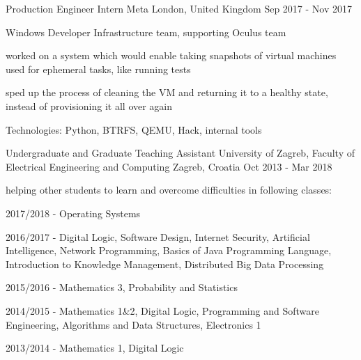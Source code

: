 \begin{cventries}
  \cventry
    {Production Engineer Intern} %
    {Meta} %
    {London, United Kingdom} %
    {Sep 2017 - Nov 2017} %
    {
      \begin{cvitems} %
        \item {Windows Developer Infrastructure team, supporting Oculus team}
        \item {worked on a system which would enable taking snapshots of virtual machines used for ephemeral tasks, like running tests}
        \item {sped up the process of cleaning the VM and returning it to a healthy state, instead of provisioning it all over again}
        \item {Technologies: Python, BTRFS, QEMU, Hack, internal tools}
      \end{cvitems}
    }

  \cventry
    {Undergraduate and Graduate Teaching Assistant} %
    {University of Zagreb, Faculty of Electrical Engineering and Computing} %
    {Zagreb, Croatia} %
    {Oct 2013 - Mar 2018} %
    {
      \begin{cvitems} %
        \item {helping other students to learn and overcome difficulties in following classes:}
        \item {2017/2018 - Operating Systems}
        \item {2016/2017 - Digital Logic, Software Design, Internet Security, Artificial Intelligence, Network Programming, Basics of Java Programming Language, Introduction to Knowledge Management, Distributed Big Data Processing}
        \item {2015/2016 - Mathematics 3, Probability and Statistics}
        \item {2014/2015 - Mathematics 1\&2, Digital Logic, Programming and Software Engineering, Algorithms and Data Structures, Electronics 1}
        \item {2013/2014 - Mathematics 1, Digital Logic}
      \end{cvitems}
    }


\end{cventries}

